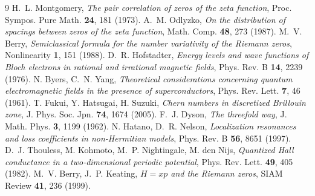 \documentclass[11pt,a4paper]{ctexart}
\begin{document}
\begin{thebibliography}{9}
 H.~L. Montgomery, \emph{The pair correlation of zeros of the zeta function}, Proc. Sympos. Pure Math. \textbf{24}, 181 (1973).
 A.~M. Odlyzko, \emph{On the distribution of spacings between zeros of the zeta function}, Math. Comp. \textbf{48}, 273 (1987).
 M.~V. Berry, \emph{Semiclassical formula for the number variativity of the Riemann zeros}, Nonlinearity \textbf{1}, 151 (1988).
 D.~R. Hofstadter, \emph{Energy levels and wave functions of Bloch electrons in rational and irrational magnetic fields}, Phys. Rev. B \textbf{14}, 2239 (1976).
 N. Byers, C.~N. Yang, \emph{Theoretical considerations concerning quantum electromagnetic fields in the presence of superconductors}, Phys. Rev. Lett. \textbf{7}, 46 (1961).
 T. Fukui, Y. Hatsugai, H. Suzuki, \emph{Chern numbers in discretized Brillouin zone}, J. Phys. Soc. Jpn. \textbf{74}, 1674 (2005).
 F.~J. Dyson, \emph{The threefold way}, J. Math. Phys. \textbf{3}, 1199 (1962).
 N. Hatano, D.~R. Nelson, \emph{Localization resonances and loss coefficients in non-Hermitian models}, Phys. Rev. B \textbf{56}, 8651 (1997).
 D.~J. Thouless, M. Kohmoto, M.~P. Nightingale, M. den Nijs, \emph{Quantized Hall conductance in a two-dimensional periodic potential}, Phys. Rev. Lett. \textbf{49}, 405 (1982).
 M.~V. Berry, J.~P. Keating, \emph{$H=xp$ and the Riemann zeros}, SIAM Review \textbf{41}, 236 (1999).
\end{thebibliography}
\end{document}
